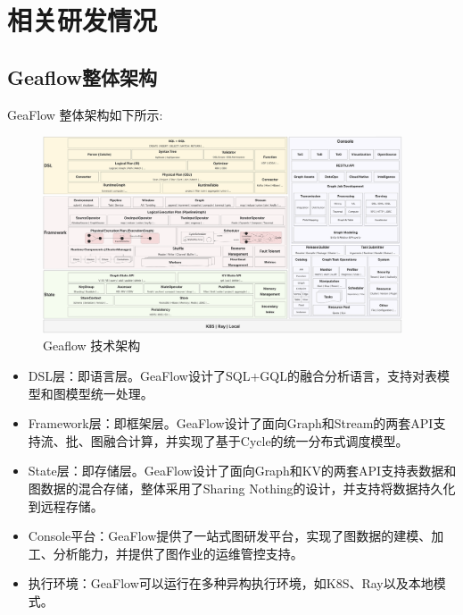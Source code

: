 \section{相关研发情况}
\subsection{Geaflow整体架构}
GeaFlow 整体架构如下所示:
\begin{figure}[H]
  \begin{center}
    \includegraphics[width=0.95\textwidth]{./figures/geaflow_arch_new.png}
  \end{center}
  \caption{Geaflow 技术架构}
\end{figure}

\begin{itemize}
  \item DSL层：即语言层。GeaFlow设计了SQL+GQL的融合分析语言，支持对表模型和图模型统一处理。
  \item Framework层：即框架层。GeaFlow设计了面向Graph和Stream的两套API支持流、批、图融合计算，并实现了基于Cycle的统一分布式调度模型。
  \item State层：即存储层。GeaFlow设计了面向Graph和KV的两套API支持表数据和图数据的混合存储，整体采用了Sharing Nothing的设计，并支持将数据持久化到远程存储。
  \item Console平台：GeaFlow提供了一站式图研发平台，实现了图数据的建模、加工、分析能力，并提供了图作业的运维管控支持。
  \item 执行环境：GeaFlow可以运行在多种异构执行环境，如K8S、Ray以及本地模式。
\end{itemize}

